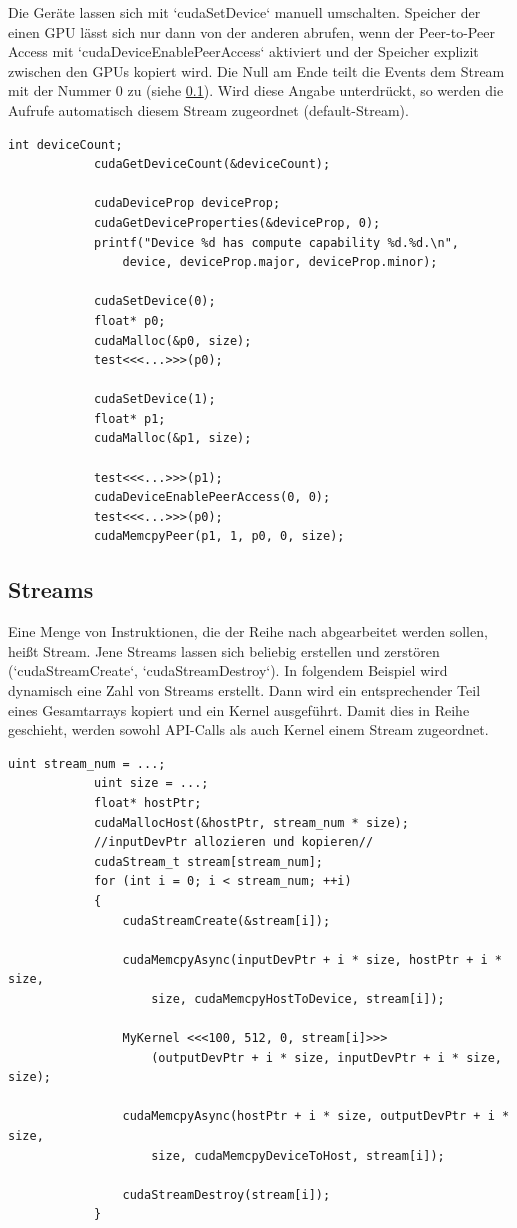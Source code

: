		Die Geräte lassen sich mit \li`cudaSetDevice` manuell umschalten. Speicher der einen GPU lässt sich nur dann von der anderen abrufen, wenn der Peer-to-Peer Access mit \li`cudaDeviceEnablePeerAccess` aktiviert und der Speicher explizit zwischen den GPUs kopiert wird. Die Null am Ende teilt die Events dem Stream mit der Nummer 0 zu (siehe \ref{streams}). Wird diese Angabe unterdrückt, so werden die Aufrufe automatisch diesem \Gls{Stream} zugeordnet (default-\Gls{Stream}).
		\begin{lstlisting}[caption=Device Peer-to-Peer Access]
			int deviceCount;
			cudaGetDeviceCount(&deviceCount);

			cudaDeviceProp deviceProp;
			cudaGetDeviceProperties(&deviceProp, 0);
			printf("Device %d has compute capability %d.%d.\n",
    			device, deviceProp.major, deviceProp.minor);
           
			cudaSetDevice(0);
			float* p0;
			cudaMalloc(&p0, size);
			test<<<...>>>(p0);
			
			cudaSetDevice(1);
			float* p1;
			cudaMalloc(&p1, size);
			
			test<<<...>>>(p1);
			cudaDeviceEnablePeerAccess(0, 0);
			test<<<...>>>(p0);
			cudaMemcpyPeer(p1, 1, p0, 0, size);
		\end{lstlisting}

	
		\subsection{Streams}\label{streams}
		Eine Menge von Instruktionen, die der Reihe nach abgearbeitet werden sollen, heißt \Gls{Stream}. Jene \Glspl{Stream} lassen sich beliebig erstellen und zerstören (\li`cudaStreamCreate`, \li`cudaStreamDestroy`). In folgendem Beispiel wird dynamisch eine Zahl von \Glspl{Stream} erstellt. Dann wird ein entsprechender Teil eines Gesamtarrays kopiert und ein Kernel ausgeführt. Damit dies in Reihe geschieht, werden sowohl \Gls{API}-Calls als auch \Gls{Kernel} einem \Gls{Stream} zugeordnet.	
		
		\begin{lstlisting}[caption=Streams]
			uint stream_num = ...;
			uint size = ...;	    
			float* hostPtr;
			cudaMallocHost(&hostPtr, stream_num * size);	
			//inputDevPtr allozieren und kopieren//
			cudaStream_t stream[stream_num];
			for (int i = 0; i < stream_num; ++i)
			{
				cudaStreamCreate(&stream[i]);
    			
				cudaMemcpyAsync(inputDevPtr + i * size, hostPtr + i * size,
					size, cudaMemcpyHostToDevice, stream[i]);
    			
				MyKernel <<<100, 512, 0, stream[i]>>>
					(outputDevPtr + i * size, inputDevPtr + i * size, size);
				
				cudaMemcpyAsync(hostPtr + i * size, outputDevPtr + i * size,
					size, cudaMemcpyDeviceToHost, stream[i]);
								
				cudaStreamDestroy(stream[i]);
			}
		\end{lstlisting}

